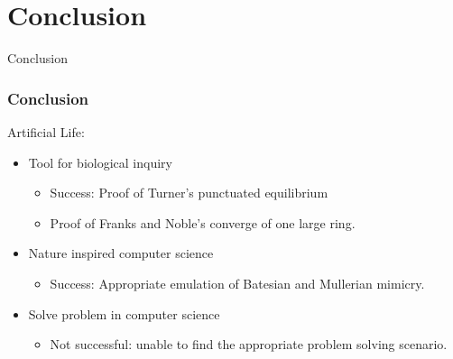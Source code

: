 \section{Conclusion}

\frame
{
	\begin{center}
		\LARGE Conclusion
	\end{center}
}

\frame
{
	\frametitle{Conclusion}
	
	Artificial Life:
	\begin{itemize}
		\item Tool for biological inquiry
			\begin{itemize}
				\item Success: Proof of Turner's punctuated equilibrium
				\item Proof of Franks and Noble's converge of one large ring.
			\end{itemize}
		\item Nature inspired computer science
			\begin{itemize}
				\item Success: Appropriate emulation of Batesian and Mullerian mimicry.
			\end{itemize}
		\item Solve problem in computer science
			\begin{itemize}
				\item Not successful: unable to find the appropriate problem solving scenario.
			\end{itemize}
	\end{itemize}
}

